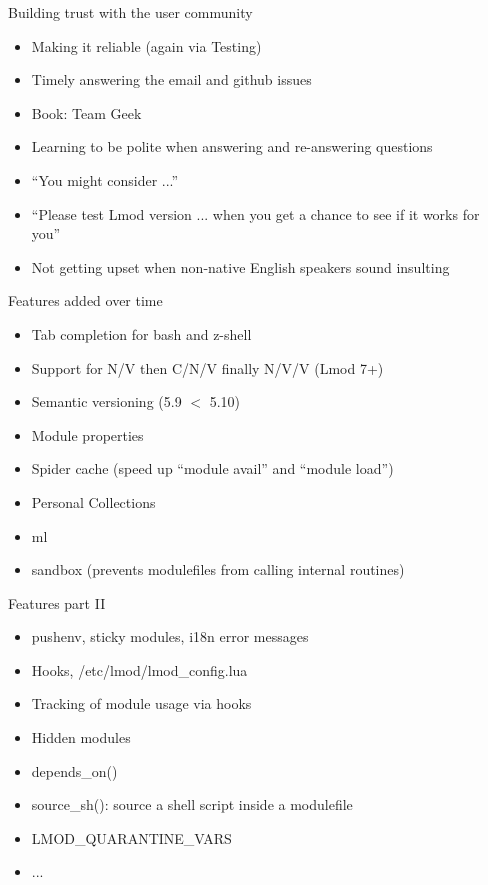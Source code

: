 \documentclass{beamer}
\begin{document}
\begin{frame}{Building trust with the user community}
  \begin{itemize}
    \item Making it reliable (again via Testing)
    \item Timely answering the email and github issues 
    \item Book: Team Geek
    \item Learning to be polite when answering and re-answering
      questions
    \item ``You might consider ...''
    \item ``Please test Lmod version ... when you get a chance to see
      if it works for you''
    \item Not getting upset when non-native English speakers sound
      insulting
  \end{itemize}
\end{frame}

\begin{frame}{Features added over time}
  \begin{itemize}
    \item Tab completion for bash and z-shell
    \item Support for N/V then C/N/V finally N/V/V (Lmod 7+)
    \item Semantic versioning (5.9 $<$ 5.10)
    \item Module properties
    \item Spider cache (speed up ``module avail'' and ``module load'')
    \item Personal Collections
    \item ml
    \item sandbox (prevents modulefiles from calling internal routines)
  \end{itemize}
\end{frame}

\begin{frame}{Features part II}
  \begin{itemize}
    \item pushenv, sticky modules, i18n error messages
    \item Hooks, /etc/lmod/lmod\_config.lua
    \item Tracking of module usage via hooks
    \item Hidden modules
    \item depends\_on()
    \item source\_sh(): source a shell script inside a modulefile
    \item LMOD\_QUARANTINE\_VARS
    \item ...
  \end{itemize}
\end{frame}
\end{document}
